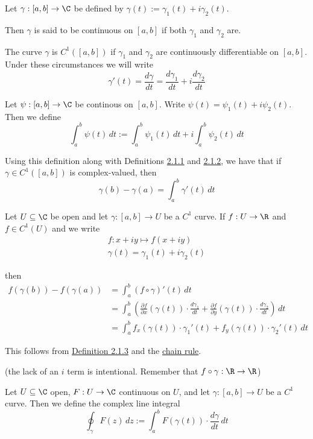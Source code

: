 \label{e4132bc}

Let $\gamma:[a,b]\to\C$ be defined by $\gamma(t):=\gamma_1(t) + i\gamma_2(t)$.

Then $\gamma$ is said to be continuous on $[a,b]$ if both $\gamma_1$ and
$\gamma_2$ are.

The curve $\gamma$ is $C^1([a,b])$ if $\gamma_1$ and $\gamma_2$ are
continuously differentiable on $[a,b]$. Under these circumstances we will write
$$
  \gamma'(t)=\frac{d\gamma}{dt}=\frac{d\gamma_1}{dt}+i\frac{d\gamma_2}{dt}
$$

\label{c511702}

Let $\psi:[a,b]\to\C$ be continous on $[a,b]$. Write
$\psi(t)=\psi_1(t)+i\psi_2(t)$. Then we define
$$
  \int_a^b\psi(t)\,dt:=\int_a^b\psi_1(t)\,dt+i\int_a^b\psi_2(t)\,dt
$$

Using this definition along with Definitions \href{c1f6d35}{2.1.1} and
\href{e4132bc}{2.1.2}, we have that if $\gamma\in C^1([a,b])$ is
complex-valued, then
$$
  \gamma(b)-\gamma(a)=\int_a^b\gamma'(t)\,dt
$$

\label{f37b676}

Let $U\subseteq\C$ be open and let $\gamma:[a,b]\to U$ be a $C^1$ curve. If
$f:U\to\R$ and $f\in C^1(U)$ and we write
\begin{gather*}
  f:x+iy\mapsto f(x+iy) \\
  \gamma(t)=\gamma_1(t)+i\gamma_2(t)
\end{gather*}

then
\begin{align*}
  f(\gamma(b))-f(\gamma(a))
   & =\int_a^b (f\circ\gamma)'(t)\,dt \\
   & =\int_a^b\left(
  \frac{\partial f}{\partial x}(\gamma(t))\cdot\frac{d\gamma_1}{dt}+
  \frac{\partial f}{\partial y}(\gamma(t))\cdot\frac{d\gamma_2}{dt}
  \right)\,dt                         \\
   & =\int_a^b
  f_x(\gamma(t))\cdot\gamma_1'(t)+f_y(\gamma(t))\cdot\gamma_2'(t)
  \,dt
\end{align*}

This follows from \href{c511702}{Definition 2.1.3} and the \href{d969d46}{chain
rule}.

(the lack of an $i$ term is intentional. Remember that
$f\circ\gamma:\R\to\R$)

\label{b1e96fc}

Let $U\subseteq\C$ open, $F:U\to\C$ continuous on $U$, and let $\gamma:[a,b]\to
U$ be a $C^1$ curve. Then we define the complex line integral
$$
  \oint_\gamma F(z)\,dz:=\int_a^bF(\gamma(t))\cdot\frac{d\gamma}{dt}\,dt
$$

